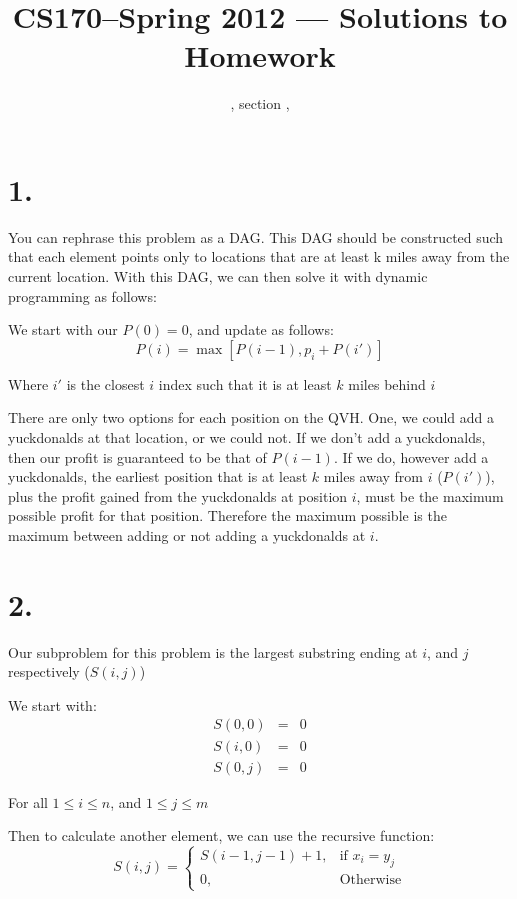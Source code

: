 \documentclass[11pt]{article}
\title{CS170--Spring 2012 --- Solutions to Homework \HW}
\author{\Name, section \Sec, \texttt{\Login}}
\begin{document}
\maketitle

\section*{1.}
You can rephrase this problem as a DAG. This DAG should be constructed such that
each element points only to locations that are at least k miles away from the
current location. With this DAG, we can then solve it with dynamic programming
as follows: 

We start with our $P(0) = 0$, and update as follows:
\begin{equation*}
P(i) = \max[P(i-1), p_i + P(i')]
\end{equation*}

Where $i'$ is the closest $i$ index such that it is at least $k$ miles behind
$i$

There are only two options for each position on the QVH. One, we could add a
yuckdonalds at that location, or we could not. If we don't add a yuckdonalds,
then our profit is guaranteed to be that of $P(i-1)$. If we do, however add a
yuckdonalds, the earliest position that is at least $k$ miles away from $i$
($P(i')$), plus the profit gained from the yuckdonalds at position $i$, must be
the maximum possible profit for that position. Therefore the maximum possible is
the maximum between adding or not adding a yuckdonalds at $i$.
\newpage
\section*{2.}
Our subproblem for this problem is the largest substring ending at $i$, and $j$
respectively ($S(i, j)$)

We start with:
\begin{eqnarray*}
S(0, 0) &=& 0\\
S(i, 0) &=& 0\\
S(0, j) &=& 0
\end{eqnarray*}

For all $1 \le i \le n$, and $1 \le j \le m$

Then to calculate another element, we can use the recursive function:
\begin{equation*}
S(i, j) = 
\begin{cases}
S(i-1, j-1) + 1, & \text{if } x_i = y_j\\
0,&\text{Otherwise}
\end{cases}
\end{equation*}
\end{document}
